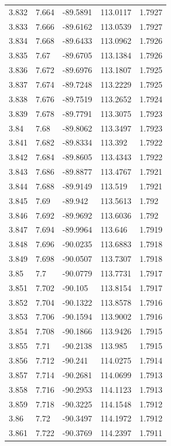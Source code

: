 \begin{tabular}{lllll}
3.832 & 7.664 & -89.5891 & 113.0117 & 1.7927 \\
3.833 & 7.666 & -89.6162 & 113.0539 & 1.7927 \\
3.834 & 7.668 & -89.6433 & 113.0962 & 1.7926 \\
3.835 & 7.67 & -89.6705 & 113.1384 & 1.7926 \\
3.836 & 7.672 & -89.6976 & 113.1807 & 1.7925 \\
3.837 & 7.674 & -89.7248 & 113.2229 & 1.7925 \\
3.838 & 7.676 & -89.7519 & 113.2652 & 1.7924 \\
3.839 & 7.678 & -89.7791 & 113.3075 & 1.7923 \\
3.84 & 7.68 & -89.8062 & 113.3497 & 1.7923 \\
3.841 & 7.682 & -89.8334 & 113.392 & 1.7922 \\
3.842 & 7.684 & -89.8605 & 113.4343 & 1.7922 \\
3.843 & 7.686 & -89.8877 & 113.4767 & 1.7921 \\
3.844 & 7.688 & -89.9149 & 113.519 & 1.7921 \\
3.845 & 7.69 & -89.942 & 113.5613 & 1.792 \\
3.846 & 7.692 & -89.9692 & 113.6036 & 1.792 \\
3.847 & 7.694 & -89.9964 & 113.646 & 1.7919 \\
3.848 & 7.696 & -90.0235 & 113.6883 & 1.7918 \\
3.849 & 7.698 & -90.0507 & 113.7307 & 1.7918 \\
3.85 & 7.7 & -90.0779 & 113.7731 & 1.7917 \\
3.851 & 7.702 & -90.105 & 113.8154 & 1.7917 \\
3.852 & 7.704 & -90.1322 & 113.8578 & 1.7916 \\
3.853 & 7.706 & -90.1594 & 113.9002 & 1.7916 \\
3.854 & 7.708 & -90.1866 & 113.9426 & 1.7915 \\
3.855 & 7.71 & -90.2138 & 113.985 & 1.7915 \\
3.856 & 7.712 & -90.241 & 114.0275 & 1.7914 \\
3.857 & 7.714 & -90.2681 & 114.0699 & 1.7913 \\
3.858 & 7.716 & -90.2953 & 114.1123 & 1.7913 \\
3.859 & 7.718 & -90.3225 & 114.1548 & 1.7912 \\
3.86 & 7.72 & -90.3497 & 114.1972 & 1.7912 \\
3.861 & 7.722 & -90.3769 & 114.2397 & 1.7911 \\

\end{tabular}
